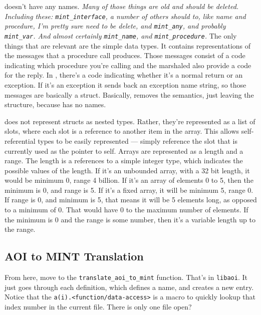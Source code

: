 \MINT{} doesn't have any names.  \emph{Many of those things are old and should be
deleted.  Including these: \texttt{mint\_interface}, a number of others should
to, like \MINT{} name and \MINT{} procedure, I'm pretty sure need to be delete, and
\texttt{mint\_any}, and probably \texttt{mint\_var}.  And almost certainly
\texttt{mint\_name}, and \texttt{mint\_procedure}.}  The only things that are
relevant are the simple data types.  It contains representations of the
messages that a procedure call produces.  Those messages consist of a code
indicating which procedure you're calling and the marshaled also provide a code
for the reply.  In \CORBA{}, there's a code indicating whether it's a normal
return or an exception.  If it's an exception it sends back an exception name
string, so those messages are basically a struct.  Basically, \MINT{} removes the
semantics, just leaving the structure, because \MINT{} has no names.

\MINT{} does not represent structs as nested types.  Rather, they're represented
as a list of slots, where each slot is a reference to another item in the \MINT{}
array.  This allows self-referential types to be easily represented --- simply
reference the slot that is currently used as the pointer to self.  Arrays are
represented as a length and a range.  The length is a references to a simple
integer type, which indicates the possible values of the length.  If it's an
unbounded array, with a 32 bit length, it would be minimum 0, range 4 billion.
If it's an array of elements 0 to 5, then the minimum is 0, and range is 5.  If
it's a fixed array, it will be minimum 5, range 0.  If range is 0, and minimum
is 5, that means it will be 5 elements long, as opposed to a minimum of 0.
That would have 0 to the maximum number of elements.  If the minimum is 0 and
the range is some number, then it's a variable length up to the range.


\subsection{AOI to MINT Translation}

From here, move to the \texttt{translate\_aoi\_to\_mint} function.  That's in
\texttt{libaoi}.  It just goes through each \AOI{} definition, which defines a
name, and creates a new \MINT{} entry.  Notice that the
\texttt{a(i).<function/data-access>} is a macro to quickly lookup that index
number in the current \AOI{} file.  There is only one file open?

